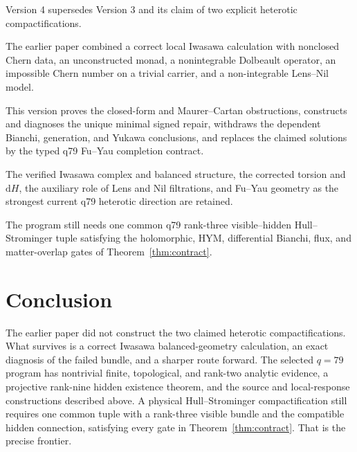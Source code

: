 \documentclass[11pt]{article}
\newcommand{\dd}{\mathrm{d}}
\theoremstyle{definition}
\theoremstyle{remark}
\begin{document}
\begin{description}[leftmargin=2.2cm,style=nextline]
\item[Supersedes]
Version 4 supersedes Version 3 and its claim of two explicit heterotic
compactifications.

\item[Reason]
The earlier paper combined a correct local Iwasawa calculation with
nonclosed Chern data, an unconstructed monad, a nonintegrable Dolbeault
operator, an impossible Chern number on a trivial carrier, and a
non-integrable Lens--Nil model.

\item[Resolution]
This version proves the closed-form and Maurer--Cartan obstructions, constructs
and diagnoses the unique minimal signed repair, withdraws the dependent
Bianchi, generation, and Yukawa conclusions, and replaces the claimed
solutions by the typed q79 Fu--Yau completion contract.

\item[Retained content]
The verified Iwasawa complex and balanced structure, the corrected torsion and
\(\dd H\), the auxiliary role of Lens and Nil filtrations, and Fu--Yau geometry
as the strongest current q79 heterotic direction are retained.

\item[Remaining boundary]
The program still needs one common q79 rank-three visible--hidden
Hull--Strominger tuple satisfying the holomorphic, HYM, differential Bianchi,
flux, and matter-overlap gates of Theorem~\ref{thm:contract}.
\end{description}

\section{Conclusion}

The earlier paper did not construct the two claimed heterotic
compactifications.  What survives is a correct Iwasawa balanced-geometry
calculation, an exact diagnosis of the failed bundle, and a sharper route
forward.  The selected \(q=79\) program has nontrivial finite, topological, and
rank-two analytic evidence, a projective rank-nine hidden existence theorem,
and the source and local-response constructions described above. A physical
Hull--Strominger compactification still requires one common tuple with a
rank-three visible bundle and the compatible hidden connection, satisfying every
gate in Theorem~\ref{thm:contract}.  That is the precise frontier.
\end{document}
